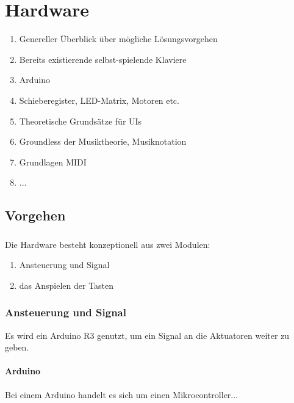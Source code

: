 \chapter{Hardware}

\nocite{*}

\begin{enumerate}
	\item Genereller Überblick über mögliche Lösungsvorgehen
	\item Bereits existierende selbst-spielende Klaviere
	\item Arduino
	\item Schieberegister, LED-Matrix, Motoren etc.
	\item Theoretische Grundsätze für UIs
	\item Groundless der Musiktheorie, Musiknotation
	\item Grundlagen MIDI
	\item ...
\end{enumerate}
\newline

\section{Vorgehen}\label{Vorgehen - Hardware}

\subsection{}

Die Hardware besteht konzeptionell aus zwei Modulen: \newline
\begin{enumerate}
	\item Ansteuerung und Signal
	\item das Anspielen der Tasten
\end{enumerate}
\newline

\subsection{Ansteuerung und Signal}\label{Ansteuerung}

Es wird ein Arduino R3 genutzt, um ein Signal an die Aktuatoren weiter zu geben.
\newline\subsubsection{Arduino}
Bei einem Arduino handelt es sich um einen Mikrocontroller...

